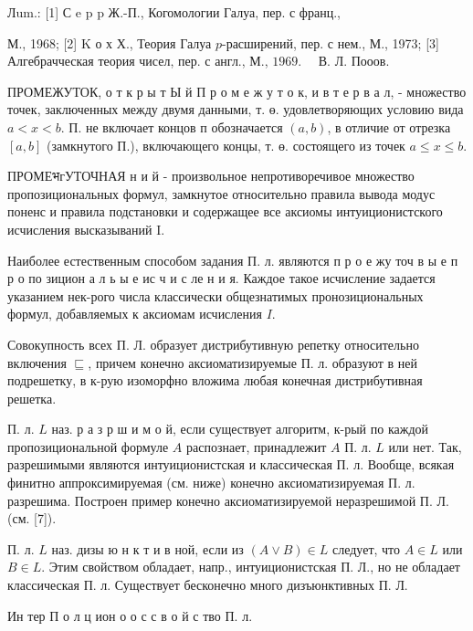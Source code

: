 \documentclass[10pt]{article}
\begin{document}
Лum.: [1] С e p p Ж.-П., Когомологии Галуа, пер. с франц.,

М., 1968; [2] K о х Х., Теория Галуа $p$-расширений, пер. с нем., М., 1973; [3] Алгебрачческая теория чисел, пер. с англ., М., $1969 . \quad$ В. Л. Пооов.



ПРОМЕЖУТОК, о т к р ы т Ы й П р о м е ж у т о к, и в т е р в а л, - множество точек, заключенных между двумя данными, т. ө. удовлетворяющих условию вида $a<x<b$. П. не включает концов п обозначается $(a, b)$, в отличие от отрезка $[a, b]$ (замкнутого П.), включающего концы, т. ө. состоящего из точек $a \leqslant x \leqslant b$.



ПРОМЕभгУТОЧНАЯ н и й - произвольное непротиворечивое множество пропозициональных формул, замкнутое относительно правила вывода модус поненс и правила подстановки и содержащее все аксиомы интуиционистского исчисления высказываний I.



Наиболее естественным способом задания П. л. являются п р о е жу точ в ы е п р о по зицион а л ь ы е ис ч и с ле н и я. Каждое такое исчисление задается указанием нек-рого числа классически общезнатимых пронозициональных формул, добавляемых к аксиомам исчисления $I$.



Совокупность всех П. Л. образует дистрибутивную репетку относительно включения $\sqsubseteq$, причем конечно аксиоматизируемые П. л. образуют в ней подрешетку, в к-рую изоморфно вложима любая конечная дистрибутивная решетка.



П. л. $L$ наз. р а з р ш и м о й, если существует алгоритм, к-рый по каждой пропозициональной формуле $A$ распознает, принадлежит $A$ П. л. $L$ или нет. Так, разрешимыми являются интуиционистская и классическая П. л. Вообще, всякая финитно аппроксимируемая (см. ниже) конечно аксиоматизируемая П. л. разрешима. Построен пример конечно аксиоматизируемой неразрешимой П. Л. (см. [7]).



П. л. $L$ наз. дизы ю н к т и в ной, если из $(A \vee B) \in L$ следует, что $A \in L$ или $B \in L$. Этим свойством обладает, напр., интуиционистская П. Л., но не обладает классическая П. л. Существует бесконечно много дизъюнктивных П. Л.



Ин тер П о л ц ион о о с с в о й с тво П. л.
\end{document}
